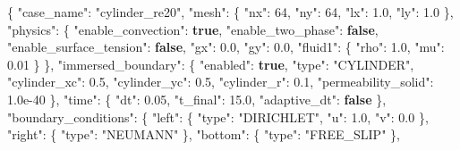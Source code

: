 \documentclass[
  french,
]{article}
\newenvironment{Shaded}{}{}
\newcommand{\DataTypeTok}[1]{\textcolor[rgb]{0.56,0.13,0.00}{#1}}
\newcommand{\DecValTok}[1]{\textcolor[rgb]{0.25,0.63,0.44}{#1}}
\newcommand{\FloatTok}[1]{\textcolor[rgb]{0.25,0.63,0.44}{#1}}
\newcommand{\FunctionTok}[1]{\textcolor[rgb]{0.02,0.16,0.49}{#1}}
\newcommand{\KeywordTok}[1]{\textcolor[rgb]{0.00,0.44,0.13}{\textbf{#1}}}
\newcommand{\StringTok}[1]{\textcolor[rgb]{0.25,0.44,0.63}{#1}}
\begin{document}
\begin{Shaded}
\begin{Highlighting}[]
\FunctionTok{\{}
  \DataTypeTok{"case\_name"}\FunctionTok{:} \StringTok{"cylinder\_re20"}\FunctionTok{,}
  \DataTypeTok{"mesh"}\FunctionTok{:} \FunctionTok{\{} \DataTypeTok{"nx"}\FunctionTok{:} \DecValTok{64}\FunctionTok{,} \DataTypeTok{"ny"}\FunctionTok{:} \DecValTok{64}\FunctionTok{,} \DataTypeTok{"lx"}\FunctionTok{:} \FloatTok{1.0}\FunctionTok{,} \DataTypeTok{"ly"}\FunctionTok{:} \FloatTok{1.0} \FunctionTok{\},}
  \DataTypeTok{"physics"}\FunctionTok{:} \FunctionTok{\{}
    \DataTypeTok{"enable\_convection"}\FunctionTok{:} \KeywordTok{true}\FunctionTok{,}
    \DataTypeTok{"enable\_two\_phase"}\FunctionTok{:} \KeywordTok{false}\FunctionTok{,}
    \DataTypeTok{"enable\_surface\_tension"}\FunctionTok{:} \KeywordTok{false}\FunctionTok{,}
    \DataTypeTok{"gx"}\FunctionTok{:} \FloatTok{0.0}\FunctionTok{,} \DataTypeTok{"gy"}\FunctionTok{:} \FloatTok{0.0}\FunctionTok{,}
    \DataTypeTok{"fluid1"}\FunctionTok{:} \FunctionTok{\{} \DataTypeTok{"rho"}\FunctionTok{:} \FloatTok{1.0}\FunctionTok{,} \DataTypeTok{"mu"}\FunctionTok{:} \FloatTok{0.01} \FunctionTok{\}}
  \FunctionTok{\},}
  \DataTypeTok{"immersed\_boundary"}\FunctionTok{:} \FunctionTok{\{}
    \DataTypeTok{"enabled"}\FunctionTok{:} \KeywordTok{true}\FunctionTok{,}
    \DataTypeTok{"type"}\FunctionTok{:} \StringTok{"CYLINDER"}\FunctionTok{,}
    \DataTypeTok{"cylinder\_xc"}\FunctionTok{:} \FloatTok{0.5}\FunctionTok{,} \DataTypeTok{"cylinder\_yc"}\FunctionTok{:} \FloatTok{0.5}\FunctionTok{,} \DataTypeTok{"cylinder\_r"}\FunctionTok{:} \FloatTok{0.1}\FunctionTok{,}
    \DataTypeTok{"permeability\_solid"}\FunctionTok{:} \FloatTok{1.0e{-}40}
  \FunctionTok{\},}
  \DataTypeTok{"time"}\FunctionTok{:} \FunctionTok{\{} \DataTypeTok{"dt"}\FunctionTok{:} \FloatTok{0.05}\FunctionTok{,} \DataTypeTok{"t\_final"}\FunctionTok{:} \FloatTok{15.0}\FunctionTok{,} \DataTypeTok{"adaptive\_dt"}\FunctionTok{:} \KeywordTok{false} \FunctionTok{\},}
  \DataTypeTok{"boundary\_conditions"}\FunctionTok{:} \FunctionTok{\{}
    \DataTypeTok{"left"}\FunctionTok{:}   \FunctionTok{\{} \DataTypeTok{"type"}\FunctionTok{:} \StringTok{"DIRICHLET"}\FunctionTok{,} \DataTypeTok{"u"}\FunctionTok{:} \FloatTok{1.0}\FunctionTok{,} \DataTypeTok{"v"}\FunctionTok{:} \FloatTok{0.0} \FunctionTok{\},}
    \DataTypeTok{"right"}\FunctionTok{:}  \FunctionTok{\{} \DataTypeTok{"type"}\FunctionTok{:} \StringTok{"NEUMANN"} \FunctionTok{\},}
    \DataTypeTok{"bottom"}\FunctionTok{:} \FunctionTok{\{} \DataTypeTok{"type"}\FunctionTok{:} \StringTok{"FREE\_SLIP"} \FunctionTok{\},}

\end{Highlighting}
\end{Shaded}
\end{document}
